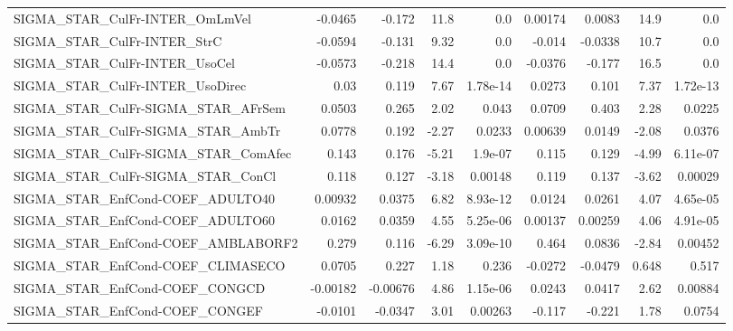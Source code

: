 \begin{tabular}{lrrrrrrrr}
SIGMA\_STAR\_CulFr-INTER\_OmLmVel         &     -0.0465 &       -0.172 &    11.8 &      0.0 &    0.00174 &      0.0083 &         14.9 &           0.0 \\
SIGMA\_STAR\_CulFr-INTER\_StrC            &     -0.0594 &       -0.131 &    9.32 &      0.0 &     -0.014 &     -0.0338 &         10.7 &           0.0 \\
SIGMA\_STAR\_CulFr-INTER\_UsoCel          &     -0.0573 &       -0.218 &    14.4 &      0.0 &    -0.0376 &      -0.177 &         16.5 &           0.0 \\
SIGMA\_STAR\_CulFr-INTER\_UsoDirec        &        0.03 &        0.119 &    7.67 & 1.78e-14 &     0.0273 &       0.101 &         7.37 &      1.72e-13 \\
SIGMA\_STAR\_CulFr-SIGMA\_STAR\_AFrSem     &      0.0503 &        0.265 &    2.02 &    0.043 &     0.0709 &       0.403 &         2.28 &        0.0225 \\
SIGMA\_STAR\_CulFr-SIGMA\_STAR\_AmbTr      &      0.0778 &        0.192 &   -2.27 &   0.0233 &    0.00639 &      0.0149 &        -2.08 &        0.0376 \\
SIGMA\_STAR\_CulFr-SIGMA\_STAR\_ComAfec    &       0.143 &        0.176 &   -5.21 &  1.9e-07 &      0.115 &       0.129 &        -4.99 &      6.11e-07 \\
SIGMA\_STAR\_CulFr-SIGMA\_STAR\_ConCl      &       0.118 &        0.127 &   -3.18 &  0.00148 &      0.119 &       0.137 &        -3.62 &       0.00029 \\
SIGMA\_STAR\_EnfCond-COEF\_ADULTO40       &     0.00932 &       0.0375 &    6.82 & 8.93e-12 &     0.0124 &      0.0261 &         4.07 &      4.65e-05 \\
SIGMA\_STAR\_EnfCond-COEF\_ADULTO60       &      0.0162 &       0.0359 &    4.55 & 5.25e-06 &    0.00137 &     0.00259 &         4.06 &      4.91e-05 \\
SIGMA\_STAR\_EnfCond-COEF\_AMBLABORF2     &       0.279 &        0.116 &   -6.29 & 3.09e-10 &      0.464 &      0.0836 &        -2.84 &       0.00452 \\
SIGMA\_STAR\_EnfCond-COEF\_CLIMASECO      &      0.0705 &        0.227 &    1.18 &    0.236 &    -0.0272 &     -0.0479 &        0.648 &         0.517 \\
SIGMA\_STAR\_EnfCond-COEF\_CONGCD         &    -0.00182 &     -0.00676 &    4.86 & 1.15e-06 &     0.0243 &      0.0417 &         2.62 &       0.00884 \\
SIGMA\_STAR\_EnfCond-COEF\_CONGEF         &     -0.0101 &      -0.0347 &    3.01 &  0.00263 &     -0.117 &      -0.221 &         1.78 &        0.0754 \\

\end{tabular}
